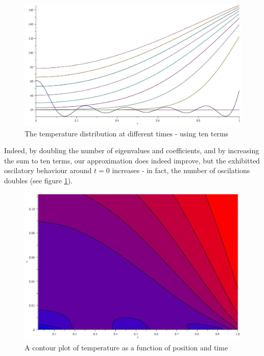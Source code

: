 \documentclass{report}
\begin{document}
\begin{figure}[h]
\centering
\includegraphics[scale = 0.15]{temperature-distribution-in-radius-double-analytic}
\caption{The temperature distribution at different times - using ten terms}
\label{fig:tdd}
\end{figure}

Indeed, by doubling the number of eigenvalues and coefficients, and by increasing the sum to ten terms, our 
approximation does indeed improve, but the exhibitted oscilatory behaviour around $t = 0$ increases - in fact, 
the number of oscilations doubles (see figure \ref{fig:tdd}).\bigskip

\begin{figure}[h]
\centering
\includegraphics[scale = 0.15]{contour-plot-analytic}
\caption{A contour plot of temperature as a function of position and time}
\label{fig:cp}
\end{figure}
\end{document}
